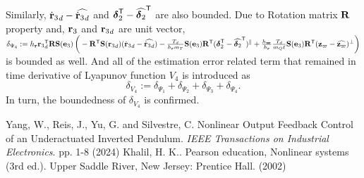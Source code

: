 \documentclass[journal,onecolumn]{IEEEtran}
\begin{document}
Similarly, $\rzddot-\widehat{\rzddot}$ and $\boldsymbol{\delta}_2^\mathsf{T}-\widehat{\boldsymbol{\delta}_2}^\mathsf{T}$ are also bounded.
Due to Rotation matrix $\RotM$ property and, $\rz$ and $\rzd$ are unit vector, $\delta_{\Psi_4}:=h_\v{r}\rzd\trs \RotM\Skew{\ez}\LP
\vphantom{\LP\frac{\partial V_4}{\partial\vL}\dir\RP\trs}
-\RotM[T]\Skew{\rzd}(\rzddot-\widehat{\rzddot})
-\frac{T_d}{h_\v{r}\mT}\Skew{\ez}\RotM[T](\bs{\delta}_2\trs-\widehat{\bs{\delta}_2}\trs)^{\|}
+\frac{h_{\bs\varpi}}{h_\v{r}}\frac{T_d}{\mQ\ellp}\Skew{\ez}\RotM[T](\zc-\widehat{\zc})^{\perp}\RP$ is bounded as well.
And all of the estimation error related term that remained in time derivative of Lyapunov function $V_4$ is introduced as
%
\begin{equation}
	\delta_{V_4} := \delta_{\Psi_1} + \delta_{\Psi_2} + \delta_{\Psi_3} + \delta_{\Psi_4}.
\end{equation}
%
In turn, the boundedness of $\delta_{V_4}$ is confirmed.

\begin{thebibliography}{9}
Yang, W., Reis, J., Yu, G. and Silvestre, C. Nonlinear Output Feedback Control of an Underactuated Inverted Pendulum. {\em IEEE Transactions on Industrial Electronics}. pp. 1-8 (2024)
Khalil, H. K.. Pearson education, Nonlinear systems (3rd ed.). Upper Saddle River, New Jersey: Prentice Hall. (2002)
\end{thebibliography}
\end{document}
